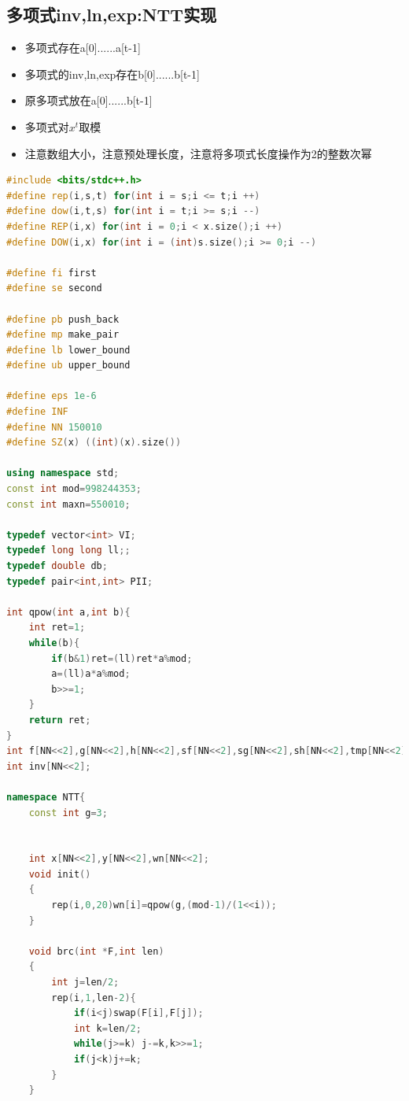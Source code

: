 \documentclass[UTF8,a4paper,titlepage]{ctexart}
\begin{document}
\subsection{多项式inv,ln,exp:NTT实现}
\begin{itemize}
	\item 多项式存在a[0]......a[t-1]
	\item 多项式的inv,ln,exp存在b[0]......b[t-1]
	\item 原多项式放在a[0]......b[t-1]
	\item 多项式对$x^t$取模
	\item 注意数组大小，注意预处理长度，注意将多项式长度操作为2的整数次幂
\end{itemize}
\begin{lstlisting}[language=C++]
#include <bits/stdc++.h>
#define rep(i,s,t) for(int i = s;i <= t;i ++)
#define dow(i,t,s) for(int i = t;i >= s;i --)
#define REP(i,x) for(int i = 0;i < x.size();i ++)
#define DOW(i,x) for(int i = (int)s.size();i >= 0;i --)

#define fi first
#define se second

#define pb push_back
#define mp make_pair
#define lb lower_bound
#define ub upper_bound

#define eps 1e-6
#define INF
#define NN 150010
#define SZ(x) ((int)(x).size())

using namespace std;
const int mod=998244353;
const int maxn=550010;

typedef vector<int> VI;
typedef long long ll;;
typedef double db;
typedef pair<int,int> PII;

int qpow(int a,int b){
	int ret=1;
	while(b){
		if(b&1)ret=(ll)ret*a%mod;
		a=(ll)a*a%mod;
		b>>=1;
	}
	return ret;
}
int f[NN<<2],g[NN<<2],h[NN<<2],sf[NN<<2],sg[NN<<2],sh[NN<<2],tmp[NN<<2],tmp2[NN<<2];
int inv[NN<<2];

namespace NTT{
    const int g=3;


    int x[NN<<2],y[NN<<2],wn[NN<<2];
    void init()
    {
        rep(i,0,20)wn[i]=qpow(g,(mod-1)/(1<<i));
    }

    void brc(int *F,int len)
    {
        int j=len/2;
        rep(i,1,len-2){
            if(i<j)swap(F[i],F[j]);
            int k=len/2;
            while(j>=k) j-=k,k>>=1;
            if(j<k)j+=k;
        }
    }


\end{lstlisting}
\end{document}
